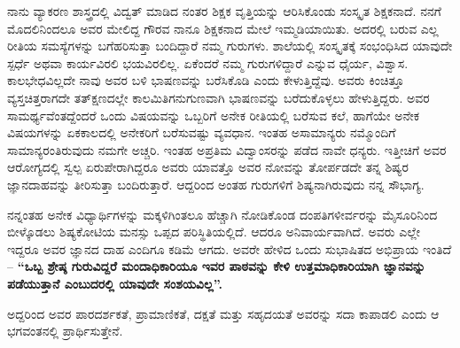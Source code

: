 ನಾನು ವ್ಯಾಕರಣ ಶಾಸ್ತ್ರದಲ್ಲಿ ವಿದ್ವತ್ ಮಾಡಿದ ನಂತರ ಶಿಕ್ಷಕ ವೃತ್ತಿಯನ್ನು ಆರಿಸಿಕೊಂಡು ಸಂಸ್ಕೃತ ಶಿಕ್ಷಕನಾದೆ. ನನಗೆ ಮೊದಲಿನಿಂದಲೂ ಅವರ ಮೇಲಿದ್ದ ಗೌರವ ನಾನೂ ಶಿಕ್ಷಕನಾದ ಮೇಲೆ ಇಮ್ಮಡಿಯಾಯಿತು. ಅದರಲ್ಲಿ ಬರುವ ಎಲ್ಲ ರೀತಿಯ ಸಮಸ್ಯೆಗಳನ್ನು ಬಗೆಹರಿಸುತ್ತಾ ಬಂದಿದ್ದಾರೆ ನಮ್ಮ ಗುರುಗಳು. ಶಾಲೆಯಲ್ಲಿ ಸಂಸ್ಕೃತಕ್ಕೆ ಸಂಭಂಧಿಸಿದ ಯಾವುದೇ ಸ್ಪರ್ಧೆ ಅಥವಾ ಕಾರ್ಯವಿರಲಿ ಭಯವಿರಲಿಲ್ಲ. ಏಕೆಂದರೆ ನಮ್ಮ ಗುರುಗಳಿದ್ದಾರೆ ಎನ್ನುವ ಧೈರ್ಯ, ವಿಶ್ವಾಸ. ಕಾಲಭೇಧವಿಲ್ಲದೇ ನಾವು ಅವರ ಬಳಿ ಭಾಷಣವನ್ನು ಬರೆಸಿಕೊಡಿ ಎಂದು ಕೇಳುತ್ತಿದ್ದೆವು. ಅವರು ಕಿಂಚಿತ್ತೂ ವ್ಯಸ್ತಚಿತ್ತರಾಗದೇ ತತ್ಕ್ಷಣದಲ್ಲೇ ಕಾಲಮಿತಿಗನುಗುಣವಾಗಿ ಭಾಷಣವನ್ನು ಬರೆದುಕೊಳ್ಳಲು ಹೇಳುತ್ತಿದ್ದರು. ಅವರ ಸಾಮರ್ಥ್ಯವೆಂತದ್ದೆಂದರೆ ಒಂದು ವಿಷಯವನ್ನು ಒಬ್ಬರಿಗೆ ಅನೇಕ ರೀತಿಯಲ್ಲಿ ಬರೆಸುವ ಕಲೆ, ಹಾಗೆಯೇ ಅನೇಕ ವಿಷಯಗಳನ್ನು ಏಕಕಾಲದಲ್ಲಿ ಅನೇಕರಿಗೆ ಬರೆಸುವಷ್ಟು ವ್ಯವಧಾನ. ಇಂತಹ ಅಸಾಮಾನ್ಯರು ನಮ್ಮೊಂದಿಗೆ ಸಾಮಾನ್ಯರಂತಿರುವುದು ನಮಗೇ ಅಚ್ಚರಿ. ಇಂತಹ ಅಪ್ರತಿಮ ವಿದ್ವಾಂಸರನ್ನು ಪಡೆದ ನಾವೇ ಧನ್ಯರು. ಇತ್ತೀಚಿಗೆ ಅವರ ಆರೋಗ್ಯದಲ್ಲಿ ಸ್ವಲ್ಪ ಏರುಪೇರಾಗಿದ್ದರೂ ಅವರು ಯಾವತ್ತೊ ಅವರ ನೋವನ್ನು ತೋರ್ಪಡದೇ ತನ್ನ ಶಿಷ್ಯರ ಜ್ಞಾನದಾಹವನ್ನು ತೀರಿಸುತ್ತಾ ಬಂದಿರುತ್ತಾರೆ. ಆದ್ದರಿಂದ ಅಂತಹ ಗುರುಗಳಿಗೆ ಶಿಷ್ಯನಾಗಿರುವುದು ನನ್ನ ಸೌಭಾಗ್ಯ.
	
ನನ್ನಂತಹ ಅನೇಕ ವಿಧ್ಯಾರ್ಥಿಗಳನ್ನು ಮಕ್ಕಳಿಗಿಂತಲೂ ಹೆಚ್ಚಾಗಿ ನೋಡಿಕೊಂಡ ದಂಪತಿಗಳೀರ್ವರನ್ನು ಮೈಸೂರಿನಿಂದ ಬೀಳ್ಕೊಡಲು ಶಿಷ್ಯಕೋಟಿಯ ಮನಸ್ಸು ಒಪ್ಪದ ಪರಿಸ್ಥಿತಿಯಲ್ಲಿದೆ. ಆದರೂ ಅನಿವಾರ್ಯವಾಗಿದೆ. ಅವರು ಎಲ್ಲೇ ಇದ್ದರೂ ಅವರ ಜ್ಞಾನದ ದಾಹ ಎಂದಿಗೂ ಕಡಿಮೆ ಆಗದು. ಅವರೇ ಹೇಳಿದ ಒಂದು ಸುಭಾಷಿತದ ಅಭಿಪ್ರಾಯ ಇಂತಿದೆ – \textbf{“ಒಬ್ಬ ಶ್ರೇಷ್ಠ ಗುರುವಿದ್ದರೆ ಮಂದಾಧಿಕಾರಿಯೂ ಇವರ ಪಾಠವನ್ನು ಕೇಳಿ ಉತ್ತಮಾಧಿಕಾರಿಯಾಗಿ ಜ್ಞಾನವನ್ನು ಪಡೆಯುತ್ತಾನೆ ಎಂಬುದರಲ್ಲಿ ಯಾವುದೇ ಸಂಶಯವಿಲ್ಲ”.}

ಅದ್ದರಿಂದ ಅವರ ಪಾರದರ್ಶಕತೆ, ಪ್ರಾಮಾಣಿಕತೆ, ದಕ್ಷತೆ ಮತ್ತು ಸಹೃದಯತೆ ಅವರನ್ನು ಸದಾ ಕಾಪಾಡಲಿ ಎಂದು ಆ ಭಗವಂತನಲ್ಲಿ ಪ್ರಾರ್ಥಿಸುತ್ತೇನೆ.

\articleend
